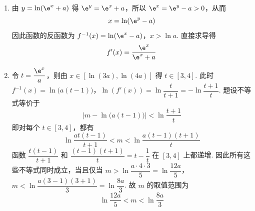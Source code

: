 \begin{solution}
\begin{enumerate}
\item 由 \(y=\ln(\e^x+a)\) 得 \(\e^y=\e^x+a\)，所以 \(\e^x=\e^y-a>0\)，从而
\[
x=\ln(\e^y-a)
\]
因此函数的反函数为
\(f^{-1}(x)=\ln(\e^x-a)\)，\(x>\ln a\).
直接求导得
\[
f'(x)=\frac{\e^x}{\e^x+a}
\]

\item 令 \(t=\dfrac{\e^x}{a}\)，则由 \(x\in[\ln(3a),\ln(4a)]\) 得 \(t\in[3,4]\). 此时
\(f^{-1}(x)=\ln\bigl(a(t-1)\bigr)\)，\(\ln(f'(x))=\ln\dfrac{t}{t+1}=-\ln\dfrac{t+1}{t}\).
题设不等式等价于
\[
\left|m-\ln\bigl(a(t-1)\bigr)\right|<\ln\frac{t+1}{t}
\]
即对每个 \(t\in[3,4]\)，都有
\[
\ln\frac{at(t-1)}{t+1}<m<\ln\frac{a(t-1)(t+1)}{t}
\]
函数 \(\dfrac{t(t-1)}{t+1}\) 和 \(\dfrac{(t-1)(t+1)}{t}=t-\dfrac1t\) 在 \([3,4]\) 上都递增. 因此所有这些不等式同时成立，当且仅当
\(m>\ln\dfrac{a\cdot4\cdot3}{5}=\ln\dfrac{12a}{5}\)，\(m<\ln\dfrac{a(3-1)(3+1)}{3}=\ln\dfrac{8a}{3}\).
故 \(m\) 的取值范围为
\[
\ln\frac{12a}{5}<m<\ln\frac{8a}{3}
\]
\end{enumerate}
\end{solution}
